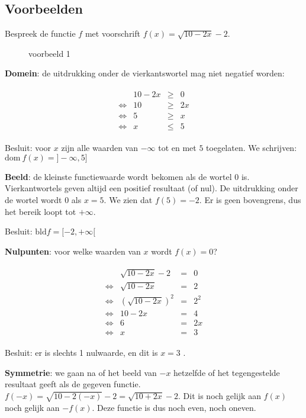 \subsection{Voorbeelden}

\begin{voorbeeld}
	Bespreek de functie $f$ met voorschrift $f(x)=\sqrt{10-2x}-2$.



\begin{figure}[H]
	\centering          
	
	\caption{voorbeeld 1}
\label{fig:reele_functies_vb1}	
\end{figure}



\textbf{Domein}: de uitdrukking onder de vierkantswortel
mag niet negatief worden:


\begin{eqnarray*}
	\begin{array}{cccc}
		& 10-2x & \geqslant & 0\\
		\iff & 10 & \geqslant & 2x\\
		\iff & 5 & \geqslant & x\\
		\iff & x & \leqslant & 5
	\end{array}
\end{eqnarray*}


Besluit: voor $x$ zijn alle waarden van $-\infty$ tot
en met $5$ toegelaten. We schrijven: $\textrm{dom}\ f(x)=]-\infty,5]$ 

\textbf{Beeld}: de kleinste functiewaarde wordt
bekomen als de wortel $0$ is. Vierkantwortels geven altijd een positief
resultaat (of nul). De uitdrukking onder de wortel wordt $0$ als
$x=5$. We zien dat $f(5)=-2$. Er is geen bovengrens, dus het bereik
loopt tot $+\infty$.

Besluit: $\textrm{bld}f=[-2,+\infty[$




\textbf{Nulpunten}: voor welke waarden van $x$ wordt $f(x)=0$?


\begin{eqnarray*}
	\begin{array}{cccc}
		& \sqrt{10-2x}-2 & = & 0\\
		\iff & \sqrt{10-2x} & = & 2\\
		\iff & \left(\sqrt{10-2x}\right)^{2} & = & 2^{2}\\
		\iff & 10-2x & = & 4\\
		\iff & 6 & = & 2x\\
		\iff & x & = & 3
	\end{array}
\end{eqnarray*}


Besluit: er is slechts 1 nulwaarde, en dit is $x=3$ .




\textbf{Symmetrie}: we gaan na of het beeld van $-x$ hetzelfde
of het tegengestelde resultaat geeft als de gegeven functie. $f(-x)=\sqrt{10-2(-x)}-2=\sqrt{10+2x}-2$.
Dit is noch gelijk aan $f(x)$ noch gelijk aan $-f(x)$. Deze functie
is dus noch even, noch oneven.

\end{voorbeeld}

